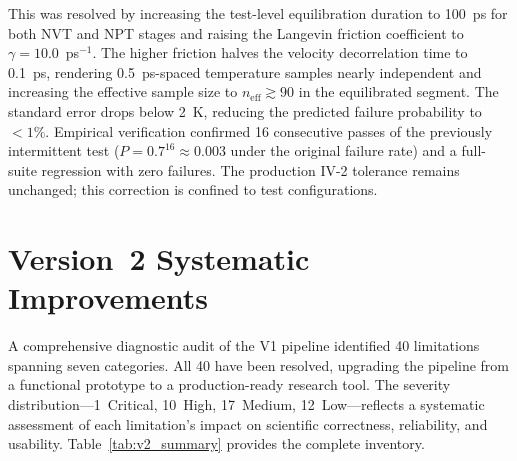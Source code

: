 \documentclass[conference]{IEEEtran}
\begin{document}
This was resolved by increasing the test-level equilibration duration to
100~ps for both NVT and NPT stages and raising the Langevin friction
coefficient to $\gamma = 10.0$~ps$^{-1}$.  The higher friction halves the
velocity decorrelation time to 0.1~ps, rendering 0.5~ps-spaced temperature
samples nearly independent and increasing the effective sample size to
$n_{\mathrm{eff}} \gtrsim 90$ in the equilibrated segment.  The standard
error drops below 2~K, reducing the predicted failure probability to
$< 1\%$.  Empirical verification confirmed 16 consecutive passes of the
previously intermittent test ($P = 0.7^{16} \approx 0.003$ under the
original failure rate) and a full-suite regression with zero failures.
The production IV-2 tolerance remains unchanged; this correction is
confined to test configurations.

\section{Version~2 Systematic Improvements}\label{sec:v2improvements}

A comprehensive diagnostic audit of the V1 pipeline identified 40
limitations spanning seven categories.  All 40 have been resolved,
upgrading the pipeline from a functional prototype to a
production-ready research tool.  The severity distribution---1~Critical,
10~High, 17~Medium, 12~Low---reflects a systematic assessment of each
limitation's impact on scientific correctness, reliability, and usability.
Table~\ref{tab:v2_summary} provides the complete inventory.
\end{document}
